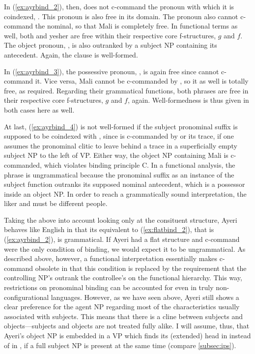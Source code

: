 In (\ref{ex:ayrbind_2}), then,  does not c-command the pronoun
with which it is coindexed, . This pronoun is also free in
its domain. The pronoun also cannot c-command the nominal, so that 
{Mali} is completely free. In functional terms as well, both 
and  {yes}{her} are free within their respective core f-structures,
$g$ and $f$. The object pronoun, , is also outranked by a
subject NP containing its antecedent. Again, the clause is well-formed.

In (\ref{ex:ayrbind_3}), the possessive pronoun, , is
again free since  cannot c-command it. Vice versa, 
{Mali} cannot be c-commanded by , so it as well is totally
free, as required. Regarding their grammatical functions, both phrases are free
in their respective core f-structures, $g$ and $f$, again. Well-formedness is
thus given in both cases here as well.

At last, (\ref{ex:ayrbind_4}) is not well-formed if the subject pronominal
suffix  is supposed to be coindexed with ,
since  is c-commanded by  or its
trace, if one assumes the pronominal clitic to leave behind a trace in a
superficially empty subject NP to the left of VP. Either way, the object NP
containing  {Mali} is c-commanded, which violates binding principle
C. In a functional analysis, the phrase is ungrammatical because the pronominal
suffix as an instance of the subject function outranks its supposed nominal
antecedent, which is a possessor inside an object NP. In order to reach a
grammatically sound interpretation, the liker and  must be
different people.

Taking the above into account looking only at the consituent structure, Ayeri
behaves like English in that its equivalent to (\ref{ex:flatbind_2}), that is
(\ref{ex:ayrbind_2}), is grammatical. If Ayeri had a flat structure and
c-command were the only condition of binding, we would expect it to be
ungrammatical. As described above, however, a functional interpretation
essentially makes c-command obsolete in that this condition is replaced by the
requirement that the controlling NP's \GF{} outrank the controllee's on the
functional hierarchy. This way, restrictions on pronominal binding can be
accounted for even in truly non-configurational languages. However, as we have
seen above, Ayeri still shows a clear preference for the agent NP regarding
most of the characteristics usually associated with subjects. This means that
there is a cline between subjects and objects---subjects and objects are not
treated fully alike. I will assume, thus, that Ayeri's object NP is embedded in
a VP which finds its (extended) head in  instead of in , if a
full subject NP is present at the same time (compare \autoref{subsec:ips}).

